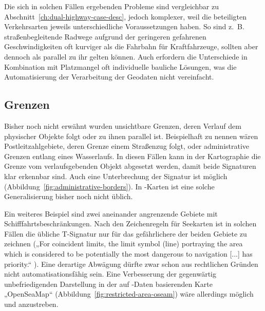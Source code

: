 \documentclass[../main/thesis.tex]{subfiles}
\begin{document}
Die sich in solchen Fällen ergebenden Probleme sind vergleichbar zu Abschnitt~\ref{ch:dual-highway-case-desc}, jedoch komplexer, weil die beteiligten Verkehrsarten jeweils unterschiedliche Voraussetzungen haben.
So sind z.~B. straßenbegleitende Radwege aufgrund der geringeren gefahrenen Geschwindigkeiten oft kurviger als die Fahrbahn für Kraftfahrzeuge, sollten aber dennoch als parallel zu ihr gelten können.
Auch erfordern die Unterschiede in Kombination mit Platzmangel oft individuelle bauliche Lösungen, was die Automatisierung der Verarbeitung der Geodaten nicht vereinfacht.


\subsection{Grenzen}

Bisher noch nicht erwähnt wurden unsichtbare Grenzen, deren Verlauf dem physischer Objekte folgt oder zu ihnen parallel ist.
Beispielhaft zu nennen wären Postleitzahlgebiete, deren Grenze einem Straßenzug folgt, oder administrative Grenzen entlang eines Wasserlaufs.
In diesen Fällen kann in der Kartographie die Grenze vom verlaufsgebenden Objekt abgesetzt werden, damit beide Signaturen klar erkennbar sind. 
Auch eine Unterbrechung der Signatur ist möglich (Abbildung~\ref{fig:administrative-borders}).
In \osm-Karten ist eine solche Generalisierung bisher noch nicht üblich.


Ein weiteres Beispiel sind zwei aneinander angrenzende Gebiete mit Schifffahrtsbeschränkungen.
Nach den Zeichenregeln für Seekarten ist in solchen Fällen die übliche T-Signatur  nur für das gefährlichere der beiden Gebiete zu zeichnen („For coincident limits, the limit symbol (line) portraying the area which is considered to be potentially the most dangerous to navigation [...] has priority.“ ).
Eine derartige Abwägung dürfte zwar schon aus rechtlichen Gründen nicht automatisationsfähig sein.
Eine Verbesserung der gegenwärtig unbefriedigenden Darstellung in der auf \osm-Daten basierenden Karte „OpenSeaMap“ (Abbildung~\ref{fig:restricted-area-oseam}) wäre allerdings möglich und anzustreben.
\end{document}

